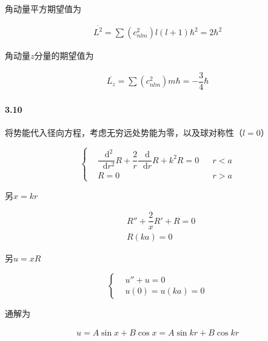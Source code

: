 \documentclass{article}
\newcommand*{\md}{\mathop{}\!\mathrm{d}}
\begin{document}
角动量平方期望值为

\begin{equation*}
  \begin{aligned}
    \overline{L^2} = \sum \left( c_{nlm}^2 \right) l \left( l+1 \right) \hbar^2
    = 2 \hbar^2
  \end{aligned}
\end{equation*}

角动量$z$分量的期望值为

\begin{equation*}
  \begin{aligned}
    \overline{L_z}
    = \sum \left( c_{nlm}^2 \right) m \hbar
    = - \dfrac{3}{4} \hbar 
  \end{aligned}
\end{equation*}

\paragraph{3.10}

将势能代入径向方程，考虑无穷远处势能为零，以及球对称性（$l=0$）

\begin{equation*}
  \left\{
  \begin{aligned}
    & \dfrac{\md^2}{\md r^2} R + \dfrac{2}{r} \dfrac{\md}{\md r}R + k^2R = 0    && r<a \\
    & R=0 && r>a
  \end{aligned}
  \right.
\end{equation*}

另$x=kr$

\begin{equation*}
  \begin{aligned}
    & R'' + \dfrac{2}{x} R' + R = 0 \\ 
    & R \left( ka \right) = 0
  \end{aligned}
\end{equation*}

另$u=xR$

\begin{equation*}
  \left\{
  \begin{aligned}
    & u'' + u = 0 \\
    & u \left( 0 \right) = u \left( ka \right) = 0
  \end{aligned}
  \right.
\end{equation*}

通解为

\begin{equation*}
  \begin{aligned}
    u = A \sin x + B \cos x = A \sin kr + B \cos kr
  \end{aligned}
\end{equation*}
\end{document}
